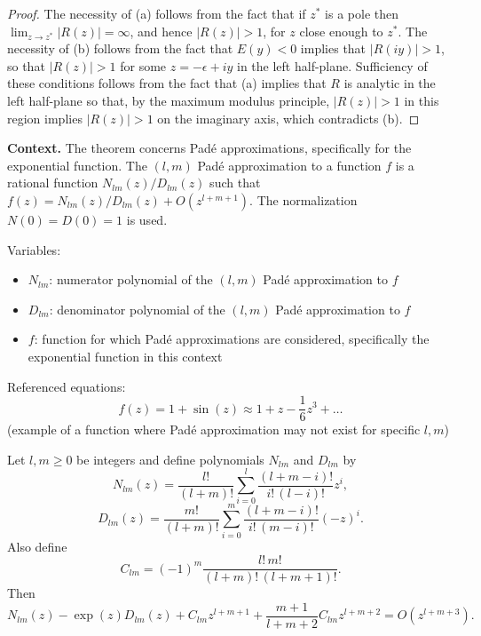 \begin{proof}

The necessity of (a) follows from the fact that if $z^*$ is a pole then
$\lim_{z \to z^*} |R(z)| = \infty$, and hence $|R(z)| > 1$, for $z$ close enough to $z^*$. The
necessity of (b) follows from the fact that $E(y) < 0$ implies that $|R(iy)| > 1$,
so that $|R(z)| > 1$ for some $z = -\epsilon + iy$ in the left half-plane. Sufficiency of
these conditions follows from the fact that (a) implies that $R$ is analytic in
the left half-plane so that, by the maximum modulus principle, $|R(z)| > 1$ in
this region implies $|R(z)| > 1$ on the imaginary axis, which contradicts (b).
\end{proof}

\noindent\textbf{Context.}
The theorem concerns Pad\'e approximations, specifically for the exponential function. The $(l, m)$ Pad\'e approximation to a function $f$ is a rational function $N_{lm}(z)/D_{lm}(z)$ such that $f(z) = N_{lm}(z)/D_{lm}(z) + O(z^{l+m+1})$. The normalization $N(0)=D(0)=1$ is used.

Variables:
\begin{itemize}
    \item $N_{lm}$: numerator polynomial of the $(l, m)$ Pad\'e approximation to $f$
    \item $D_{lm}$: denominator polynomial of the $(l, m)$ Pad\'e approximation to $f$
    \item $f$: function for which Pad\'e approximations are considered, specifically the exponential function in this context
\end{itemize}

Referenced equations:
\begin{equation}
f(z) = 1 + \sin(z) \approx 1 + z - \frac{1}{6}z^{3} + \dots
\tag{352a}
\end{equation}
(example of a function where Pad\'e approximation may not exist for specific $l, m$)

\begin{theorem}

  \label{thm:352A}
Let $l, m \geq 0$ be integers and define polynomials $N_{lm}$ and $D_{lm}$ by
\[
N_{lm}(z) = \frac{l!}{(l+m)!} \sum_{i=0}^{l} \frac{(l+m-i)!}{i!\,(l-i)!} z^{i}, \tag{352b}
\]
\[
D_{lm}(z) = \frac{m!}{(l+m)!} \sum_{i=0}^{m} \frac{(l+m-i)!}{i!\,(m-i)!} (-z)^{i}. \tag{352c}
\]
Also define
\[
C_{lm} = (-1)^{m} \frac{l!\,m!}{(l+m)!\,(l+m+1)!}.
\]
Then
\[
N_{lm}(z) - \exp(z) D_{lm}(z) + C_{lm} z^{l+m+1} + \frac{m+1}{l+m+2} C_{lm} z^{l+m+2} = O(z^{l+m+3}). \tag{352d}
\]
\end{theorem}

